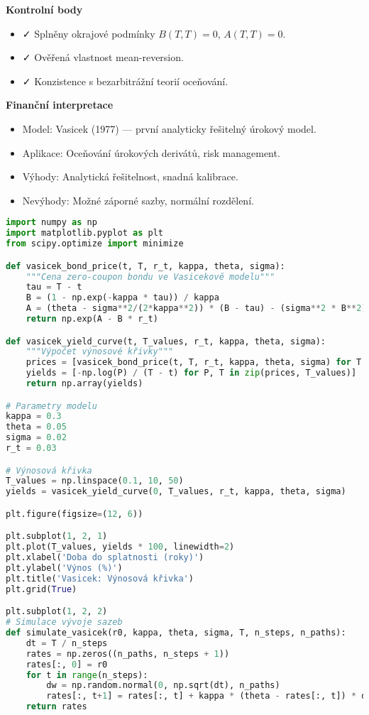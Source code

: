 \begin{example}
\noindent\textbf{Kontrolní body}
\begin{itemize}
\item ✓ Splněny okrajové podmínky $B(T,T)=0$, $A(T,T)=0$.
\item ✓ Ověřená vlastnost mean-reversion.
\item ✓ Konzistence s bezarbitrážní teorií oceňování.
\end{itemize}

\noindent\textbf{Finanční interpretace}
\begin{itemize}
\item Model: Vasicek (1977) — první analyticky řešitelný úrokový model.
\item Aplikace: Oceňování úrokových derivátů, risk management.
\item Výhody: Analytická řešitelnost, snadná kalibrace.
\item Nevýhody: Možné záporné sazby, normální rozdělení.
\end{itemize}

\begin{lstlisting}[language=Python, caption={Implementace Vasicekova modelu v Pythonu}]
import numpy as np
import matplotlib.pyplot as plt
from scipy.optimize import minimize

def vasicek_bond_price(t, T, r_t, kappa, theta, sigma):
    """Cena zero-coupon bondu ve Vasicekově modelu"""
    tau = T - t
    B = (1 - np.exp(-kappa * tau)) / kappa
    A = (theta - sigma**2/(2*kappa**2)) * (B - tau) - (sigma**2 * B**2)/(4*kappa)
    return np.exp(A - B * r_t)

def vasicek_yield_curve(t, T_values, r_t, kappa, theta, sigma):
    """Výpočet výnosové křivky"""
    prices = [vasicek_bond_price(t, T, r_t, kappa, theta, sigma) for T in T_values]
    yields = [-np.log(P) / (T - t) for P, T in zip(prices, T_values)]
    return np.array(yields)

# Parametry modelu
kappa = 0.3
theta = 0.05
sigma = 0.02
r_t = 0.03

# Výnosová křivka
T_values = np.linspace(0.1, 10, 50)
yields = vasicek_yield_curve(0, T_values, r_t, kappa, theta, sigma)

plt.figure(figsize=(12, 6))

plt.subplot(1, 2, 1)
plt.plot(T_values, yields * 100, linewidth=2)
plt.xlabel('Doba do splatnosti (roky)')
plt.ylabel('Výnos (%)')
plt.title('Vasicek: Výnosová křivka')
plt.grid(True)

plt.subplot(1, 2, 2)
# Simulace vývoje sazeb
def simulate_vasicek(r0, kappa, theta, sigma, T, n_steps, n_paths):
    dt = T / n_steps
    rates = np.zeros((n_paths, n_steps + 1))
    rates[:, 0] = r0
    for t in range(n_steps):
        dw = np.random.normal(0, np.sqrt(dt), n_paths)
        rates[:, t+1] = rates[:, t] + kappa * (theta - rates[:, t]) * dt + sigma * dw
    return rates


\end{lstlisting}
\end{example}
